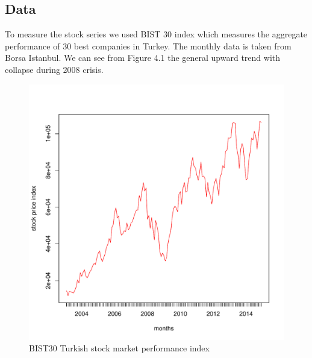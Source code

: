 \documentclass[]{elsarticle}
\begin{document}
\subsection{Data}

To measure the stock series we used BIST 30 index which measures the aggregate performance of 30 best companies in Turkey. The monthly data is taken from Borsa Istanbul. We can see from Figure 4.1 the general upward trend with collapse during 2008 crisis.

\begin{figure}
	\centering
    \begin{minipage}{0.45\textwidth}
		\centering
		\includegraphics[scale=0.4]{figs/bist.pdf}
		\caption{BIST30 Turkish stock market performance index}
	\end{minipage}
	\hfill
    \begin{minipage}{0.45\textwidth}
		\centering

\end{minipage}
\end{figure}
\end{document}
